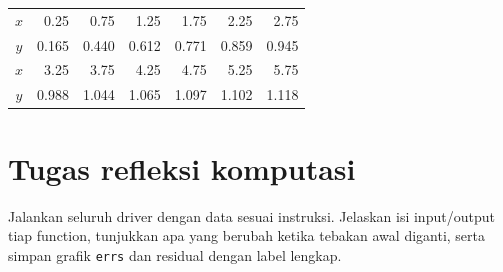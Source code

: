 \begin{center}\small
\begin{tabular}{c|rrrrrr}\hline
$x$&0.25&0.75&1.25&1.75&2.25&2.75\\
$y$&0.165&0.440&0.612&0.771&0.859&0.945\\\hline
$x$&3.25&3.75&4.25&4.75&5.25&5.75\\
$y$&0.988&1.044&1.065&1.097&1.102&1.118\\\hline
\end{tabular}
\end{center}




\section{Tugas refleksi komputasi}
Jalankan seluruh driver dengan data sesuai instruksi. Jelaskan isi input/output tiap function, tunjukkan apa yang berubah ketika tebakan awal diganti, serta simpan grafik \texttt{errs} dan residual dengan label lengkap.
